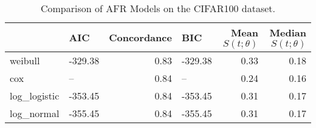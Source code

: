 \begin{table}
\caption{Comparison of AFR Models on the CIFAR100 dataset.}
\label{tab:cifar100}
\begin{tabular}{llrlrr}
\toprule
 & AIC & Concordance & BIC & Mean $S(t;\theta)$ & Median $S(t;\theta)$ \\
\midrule
weibull & -329.38 & 0.83 & -329.38 & 0.33 & 0.18 \\
cox & -- & 0.84 & -- & 0.24 & 0.16 \\
log_logistic & -353.45 & 0.84 & -353.45 & 0.31 & 0.17 \\
log_normal & -355.45 & 0.84 & -355.45 & 0.31 & 0.17 \\
\bottomrule
\end{tabular}
\end{table}
